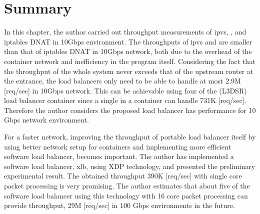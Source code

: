 \FloatBarrier

\section{Summary}

In this chapter, the author carried out throughput measurements of ipvs, , and iptables DNAT in 10Gbps environment.
The throughputs of ipvs and  are smaller than that of iptables DNAT in 10Gbps network, both due to the overhead of the container network and inefficiency in the program itself.
Considering the fact that the throughput of the whole system never exceeds that of the upstream router at the entrance, the load balancers only need to be able to handle at most 2.9M [req/sec] in 10Gbps network.
This can be achievable using four of the  (L3DSR) load balancer container since a single  in a container can handle 731K [req/sec].
Therefore the author considers the proposed load balancer has  performance for 10 Gbps network environment.

For a faster network, improving the throughput of portable load balancer itself by using better network setup for containers and implementing more efficient software load balancer, becomes important.
The author has implemented a software load balancer, xlb, using XDP technology, and presented the preliminary experimental result.
The obtained throughput 390K [req/sec] with single core packet processing is very promising.
The author estimates that about five of the software load balancer using this technology with 16 core packet processing can provide  throughput, 29M [req/sec] in 100 Gbps environments in the future. 


